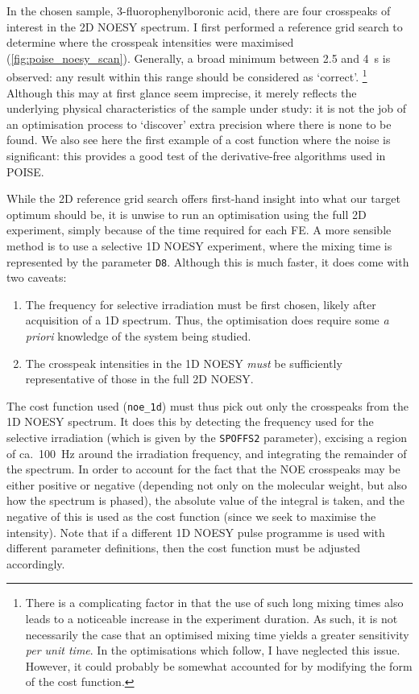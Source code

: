 In the chosen sample, 3-fluorophenylboronic acid, there are four crosspeaks of interest in the 2D NOESY spectrum.
I first performed a reference grid search to determine where the crosspeak intensities were maximised (\cref{fig:poise_noesy_scan}).
Generally, a broad minimum between 2.5 and \qty{4}{\s} is observed: any result within this range should be considered as `correct'.%
\footnote{There is a complicating factor in that the use of such long mixing times also leads to a noticeable increase in the experiment duration. As such, it is not necessarily the case that an optimised mixing time yields a greater sensitivity \textit{per unit time}. In the optimisations which follow, I have neglected this issue. However, it could probably be somewhat accounted for by modifying the form of the cost function.}
Although this may at first glance seem imprecise, it merely reflects the underlying physical characteristics of the sample under study: it is not the job of an optimisation process to `discover' extra precision where there is none to be found.
We also see here the first example of a cost function where the noise is significant: this provides a good test of the derivative-free algorithms used in POISE.

While the 2D reference grid search offers first-hand insight into what our target optimum should be, it is unwise to run an optimisation using the full 2D experiment, simply because of the time required for each FE.
A more sensible method is to use a selective 1D NOESY experiment, where the mixing time is represented by the parameter \texttt{D8}.
Although this is much faster, it does come with two caveats:
\begin{enumerate}
    \item The frequency for selective irradiation must be first chosen, likely after acquisition of a 1D \proton{} spectrum.
        Thus, the optimisation does require some \textit{a priori} knowledge of the system being studied.
    \item The crosspeak intensities in the 1D NOESY \textit{must} be sufficiently representative of those in the full 2D NOESY.
\end{enumerate}

The cost function used (\texttt{noe\_1d}) must thus pick out only the crosspeaks from the 1D NOESY spectrum.
It does this by detecting the frequency used for the selective irradiation (which is given by the \texttt{SPOFFS2} parameter), excising a region of ca.\ \qty{100}{\Hz} around the irradiation frequency, and integrating the remainder of the spectrum.
In order to account for the fact that the NOE crosspeaks may be either positive or negative (depending not only on the molecular weight, but also how the spectrum is phased), the absolute value of the integral is taken, and the negative of this is used as the cost function (since we seek to maximise the intensity).
Note that if a different 1D NOESY pulse programme is used with different parameter definitions, then the cost function must be adjusted accordingly.

